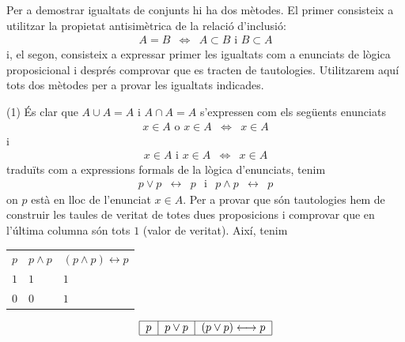 \begin{solucio}
Per a demostrar igualtats de conjunts hi ha dos mètodes. El primer
consisteix a utilitzar la propietat antisimètrica de la relació
d'inclusió:%
\begin{equation*}
\begin{array}{ccc}
A=B & \Longleftrightarrow & A\subset B\text{ i }B\subset A%
\end{array}%
\end{equation*}%
i, el segon, consisteix a expressar primer les igualtats com a enunciats de lògica proposicional i després comprovar que es tracten de
tautologies. Utilitzarem aquí tots dos mètodes per a provar les
igualtats indicades.

(1) És clar que $A\cup A=A$ i $A\cap A=A$ s'expressen com els següents enunciats%
\begin{equation*}
\begin{array}{ccc}
x\in A\text{ o }x\in A & \Longleftrightarrow & x\in A%
\end{array}%
\end{equation*}%
i%
\begin{equation*}
\begin{array}{ccc}
x\in A\text{ i }x\in A & \Longleftrightarrow & x\in A%
\end{array}%
\end{equation*}%
traduïts com a expressions formals de la lògica d'enunciats, tenim%
\begin{equation*}
\begin{array}{ccc}
p\vee p & \longleftrightarrow & p%
\end{array}%
\text{ \ \ i \ \ }%
\begin{array}{ccc}
p\wedge p & \longleftrightarrow & p%
\end{array}%
\end{equation*}%
on $p$ està en lloc de l'enunciat $x\in A$. Per a provar que són
tautologies hem de construir les taules de veritat de totes dues
proposicions i comprovar que en l'última columna són tots $1$ (valor
de veritat). Així, tenim%
\begin{tabular}{lll}
$p$ & $p\wedge p$ & $\left( p\wedge p\right) \longleftrightarrow p$ \\
$1$ & $1$ & $1$ \\
$0$ & $0$ & $1$%
\end{tabular}%
\begin{equation*}
\begin{tabular}{|l|l|l|}
\hline
$p$ & $p\vee p$ & $\left( p\vee p\right) \longleftrightarrow p$ \\ \hline

\end{tabular}
\end{equation*}
\end{solucio}
